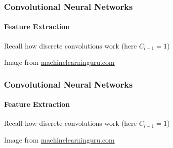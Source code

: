 \documentclass[xetex,professionalfont]{beamer}
\begin{document}
\begin{frame}
\frametitle{Convolutional Neural Networks}
\framesubtitle{Feature Extraction}

Recall how discrete convolutions work (here $C_{l-1}=1$)

\medskip

\begin{center}
    {\centering Image from \href{http://machinelearninguru.com/computer_vision/basics/convolution/image_convolution_1.html}{machinelearninguru.com}}
\end{center}

\end{frame}


\begin{frame}
\frametitle{Convolutional Neural Networks}
\framesubtitle{Feature Extraction}

Recall how discrete convolutions work (here $C_{l-1}=1$)

\medskip

\begin{center}
    {\centering Image from \href{http://machinelearninguru.com/computer_vision/basics/convolution/image_convolution_1.html}{machinelearninguru.com}}
\end{center}

\end{frame}
\end{document}
